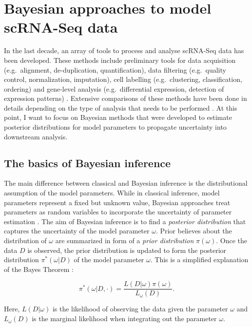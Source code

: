 
\section{Bayesian approaches to model scRNA-Seq data}

In the last decade, an array of tools to process and analyse scRNA-Seq data has been developed. These methods include preliminary tools for data acquisition (e.g.~alignment, de-duplication, quantification), data filtering (e.g.~quality control, normalization, imputation), cell labelling (e.g.~clustering, classification, ordering) and gene-level analysis (e.g.~differential expression, detection of expression patterns) \citep{Zappia2018}. Extensive comparisons of these methods have been done in details depending on the type of analysis that needs to be performed \citep{Saelens2018, Soneson2018}. At this point, I want to focus on Bayesian methods that were developed to estimate posterior distributions for model parameters to propagate uncertainty into downstream analysis. 

\subsection{The basics of Bayesian inference}

The main difference between classical and Bayesian inference is the distributional assumption of the model parameters. While in classical inference, model parameters represent a fixed but unknown value, Bayesian approaches treat parameters as random variables to incorporate the uncertainty of parameter estimation \citep{Bernardo2003}. The aim of Bayesian inference is to find a \emph{posterior distribution} that captures the uncertainty of the model parameter $\omega$. Prior believes about the distribution of $\omega$ are summarized in form of a \emph{prior distribution} $\pi(\omega)$. Once the data $D$ is observed, the prior distribution is updated to form the posterior distribution $\pi^*(\omega|D)$ of the model parameter $\omega$. This is a simplified explanation of the Bayes Theorem \cite{Bayes1763}:

\begin{equation} \label{eq0:Bayes_theorem}
\pi^*(\omega|D,\cdot)=\frac{L(D|\omega)\pi(\omega)}{L_\omega(D)}.
\end{equation}

Here, $L(D|\omega)$ is the likelihood of observing the data given the parameter $\omega$ and $L_\omega(D)$ is the marginal likelihood when integrating out the parameter $\omega$.\\

